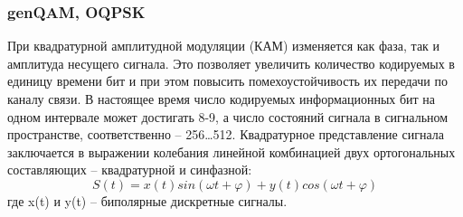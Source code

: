 \subsubsection{genQAM, OQPSK}
При квадратурной амплитудной модуляции (КАМ) изменяется как фаза, так и амплитуда несущего сигнала. Это позволяет увеличить количество кодируемых в единицу времени бит и при этом повысить помехоустойчивость их передачи по каналу связи. В настоящее время число кодируемых информационных бит на одном интервале может достигать 8-9, а число состояний сигнала в сигнальном пространстве, соответственно – 256…512.
Квадратурное представление сигнала заключается в выражении колебания линейной комбинацией двух ортогональных составляющих – квадратурной и синфазной:
\begin{equation}
	S(t) = x(t) sin(\omega t + \varphi) + y(t) cos(\omega t + \varphi)
\end{equation}
где x(t) и y(t) – биполярные дискретные сигналы.

